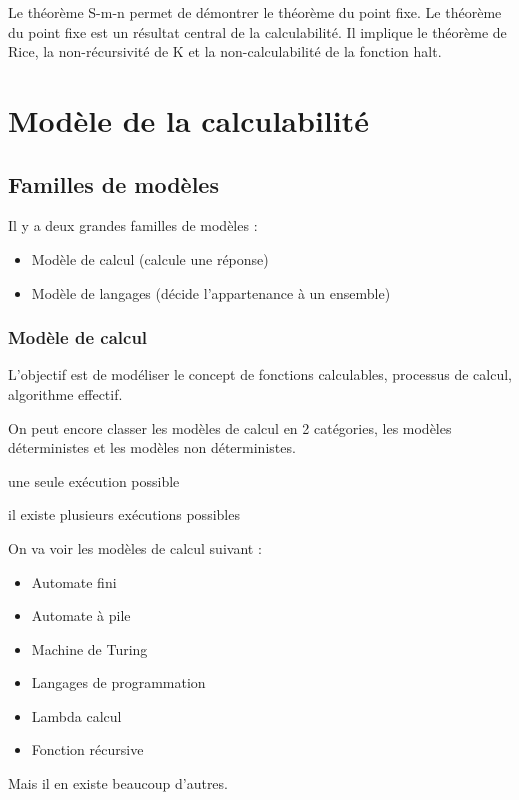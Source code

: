 Le théorème S-m-n permet de démontrer le théorème du point fixe.
Le théorème du point fixe est un résultat central de la calculabilité. Il 
implique le théorème de Rice, la non-récursivité de K et la non-calculabilité 
de la fonction halt.


\section{Modèle de la calculabilité}
\label{sec:mod_le_de_la_calculabilit_}

\subsection{Familles de modèles}
\label{sub:fammilles_de_mod_les}

Il y a deux grandes familles de modèles :
\begin{itemize}
	\item Modèle de calcul (calcule une réponse)
	\item Modèle de langages (décide l'appartenance à un ensemble)
\end{itemize}

\subsubsection{Modèle de calcul}
\label{ssub:mod_le_de_calcul}
L'objectif est de modéliser le concept de fonctions calculables, processus de 
calcul, algorithme effectif.

On peut encore classer les modèles de calcul en 2 catégories, les 
modèles déterministes et les modèles non déterministes.

\begin{mydef} une seule exécution possible
\end{mydef}

\begin{mydef} il existe plusieurs exécutions 
	possibles
\end{mydef}

On va voir les modèles de calcul suivant : 
\begin{itemize}
	\item Automate fini
	\item Automate à pile
	\item Machine de Turing
	\item Langages de programmation
	\item Lambda calcul
	\item Fonction récursive
\end{itemize}
Mais il en existe beaucoup d'autres.

